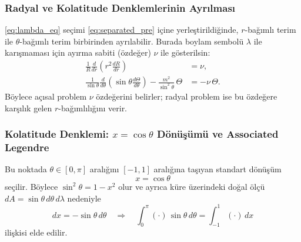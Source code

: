 \subsubsection{Radyal ve Kolatitude Denklemlerinin Ayrılması}
\label{subsubsec:radial_theta_split}

\eqref{eq:lambda_eq} seçimi \eqref{eq:separated_pre} içine yerleştirildiğinde,
$r$-bağımlı terim ile $\theta$-bağımlı terim birbirinden ayrılabilir. Burada boylam sembolü $\lambda$ ile karışmaması için
ayırma sabiti (özdeğer) \textbf{$\nu$} ile gösterilsin:
\begin{align}
\frac{1}{R}\frac{d}{dr}\!\left(r^2\frac{dR}{dr}\right) &= \nu,
\label{eq:radial_eq_general}\\[4pt]
\frac{1}{\sin\theta}\frac{d}{d\theta}
\left(\sin\theta\frac{d\Theta}{d\theta}\right)
-
\frac{m^2}{\sin^2\theta}\,\Theta
&=
-\nu\,\Theta.
\label{eq:theta_eq_theta}
\end{align}
Böylece açısal problem $\nu$ özdeğerini belirler; radyal problem ise bu özdeğere karşılık gelen $r$-bağımlılığını verir.

\subsubsection{Kolatitude Denklemi: $x=\cos\theta$ Dönüşümü ve Associated Legendre}
\label{subsubsec:theta_associated_legendre}

Bu noktada $\theta\in[0,\pi]$ aralığını $[-1,1]$ aralığına taşıyan standart dönüşüm
\begin{equation}
x=\cos\theta
\label{eq:x_costheta}
\end{equation}
seçilir. Böylece $\sin^2\theta=1-x^2$ olur ve ayrıca küre üzerindeki doğal ölçü
$dA=\sin\theta\,d\theta\,d\lambda$ nedeniyle
\begin{equation}
dx=-\sin\theta\,d\theta
\quad\Longrightarrow\quad
\int_{0}^{\pi}(\cdot)\,\sin\theta\,d\theta
=
\int_{-1}^{1}(\cdot)\,dx
\label{eq:measure_transform}
\end{equation}
ilişkisi elde edilir.

